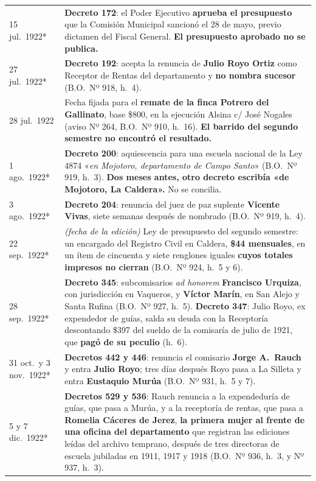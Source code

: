 \begin{longtable}{@{}p{2.7cm}p{10.3cm}@{}}
15 jul.\ 1922* & \textbf{Decreto 172}: el Poder Ejecutivo \textbf{aprueba el presupuesto} que la Comisión Municipal sancionó el 28 de mayo, previo dictamen del Fiscal General. \textbf{El presupuesto aprobado no se publica.} \\
27 jul.\ 1922* & \textbf{Decreto 192}: acepta la renuncia de \textbf{Julio Royo Ortiz} como Receptor de Rentas del departamento y \textbf{no nombra sucesor} (B.O.\ Nº 918, h.\ 4). \\
28 jul.\ 1922 & Fecha fijada para el \textbf{remate de la finca Potrero del Gallinato}, base \$800, en la ejecución Alsina c/ José Nogales (aviso Nº 264, B.O.\ Nº 910, h.\ 16). \textbf{El barrido del segundo semestre no encontró el resultado.} \\
1 ago.\ 1922* & \textbf{Decreto 200}: aquiescencia para una escuela nacional de la Ley 4874 «\textit{en Mojotoro, departamento de Campo Santo}» (B.O.\ Nº 919, h.\ 3). \textbf{Dos meses antes, otro decreto escribía «de Mojotoro, La Caldera».} No se concilia. \\
3 ago.\ 1922* & \textbf{Decreto 204}: renuncia del juez de paz suplente \textbf{Vicente Vivas}, siete semanas después de nombrado (B.O.\ Nº 919, h.\ 4). \\
22 sep.\ 1922* & \textit{(fecha de la edición)} Ley de presupuesto del segundo semestre: un encargado del Registro Civil en Caldera, \textbf{\$44 mensuales}, en un ítem de cincuenta y siete renglones iguales \textbf{cuyos totales impresos no cierran} (B.O.\ Nº 924, h.\ 5 y 6). \\
28 sep.\ 1922* & \textbf{Decreto 345}: subcomisarios \textit{ad honorem} \textbf{Francisco Urquiza}\index{Urquiza, Francisco S.}, con jurisdicción en Vaqueros, y \textbf{Víctor Marín}, en San Alejo y Santa Rufina (B.O.\ Nº 927, h.\ 5). \textbf{Decreto 347}: Julio Royo, ex expendedor de guías, salda su deuda con la Receptoría descontando \$397 del sueldo de la comisaría de julio de 1921, que \textbf{pagó de su peculio} (h.\ 6). \\
31 oct.\ y 3 nov.\ 1922* & \textbf{Decretos 442 y 446}: renuncia el comisario \textbf{Jorge A.\ Rauch} y entra \textbf{Julio Royo}; tres días después Royo pasa a La Silleta y entra \textbf{Eustaquio Murúa}\index{Murúa, Eustaquio} (B.O.\ Nº 931, h.\ 5 y 7). \\
5 y 7 dic.\ 1922* & \textbf{Decretos 529 y 536}: Rauch renuncia a la expendeduría de guías, que pasa a Murúa, y a la receptoría de rentas, que pasa a \textbf{Romelia Cáceres de Jerez}, \textbf{la primera mujer al frente de una oficina del departamento} que registran las ediciones leídas del archivo temprano, después de tres directoras de escuela jubiladas en 1911, 1917 y 1918 (B.O.\ Nº 936, h.\ 3, y Nº 937, h.\ 3). \\

\end{longtable}

